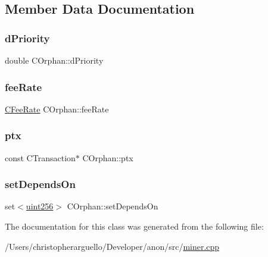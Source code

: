\subsection{Member Data Documentation}
\mbox{\label{class_c_orphan_a899f7928b6d4e9206ce04d5b2953da33}} 
\subsubsection{\texorpdfstring{d\+Priority}{dPriority}}
{\footnotesize\ttfamily double C\+Orphan\+::d\+Priority}

\mbox{\label{class_c_orphan_a2aab629162d580085082408643149e92}} 
\subsubsection{\texorpdfstring{fee\+Rate}{feeRate}}
{\footnotesize\ttfamily \mbox{\hyperlink{class_c_fee_rate}{C\+Fee\+Rate}} C\+Orphan\+::fee\+Rate}

\mbox{\label{class_c_orphan_a6bc886fad47f30a4c1cc80dc764e4095}} 
\subsubsection{\texorpdfstring{ptx}{ptx}}
{\footnotesize\ttfamily const C\+Transaction$\ast$ C\+Orphan\+::ptx}

\mbox{\label{class_c_orphan_a1b19183565d42c20ded09a2cc787fc50}} 
\subsubsection{\texorpdfstring{set\+Depends\+On}{setDependsOn}}
{\footnotesize\ttfamily set$<$\mbox{\hyperlink{classuint256}{uint256}}$>$ C\+Orphan\+::set\+Depends\+On}



The documentation for this class was generated from the following file\+:\begin{DoxyCompactItemize}
\item 
/\+Users/christopherarguello/\+Developer/anon/src/\mbox{\hyperlink{miner_8cpp}{miner.\+cpp}}\end{DoxyCompactItemize}
